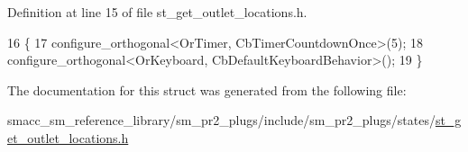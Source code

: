Definition at line 15 of file st\+\_\+get\+\_\+outlet\+\_\+locations.\+h.


\begin{DoxyCode}
16     \{
17         configure\_orthogonal<OrTimer,  CbTimerCountdownOnce>(5);    
18         configure\_orthogonal<OrKeyboard, CbDefaultKeyboardBehavior>();
19     \}
\end{DoxyCode}


The documentation for this struct was generated from the following file\+:\begin{DoxyCompactItemize}
\item 
smacc\+\_\+sm\+\_\+reference\+\_\+library/sm\+\_\+pr2\+\_\+plugs/include/sm\+\_\+pr2\+\_\+plugs/states/\hyperlink{st__get__outlet__locations_8h}{st\+\_\+get\+\_\+outlet\+\_\+locations.\+h}\end{DoxyCompactItemize}
